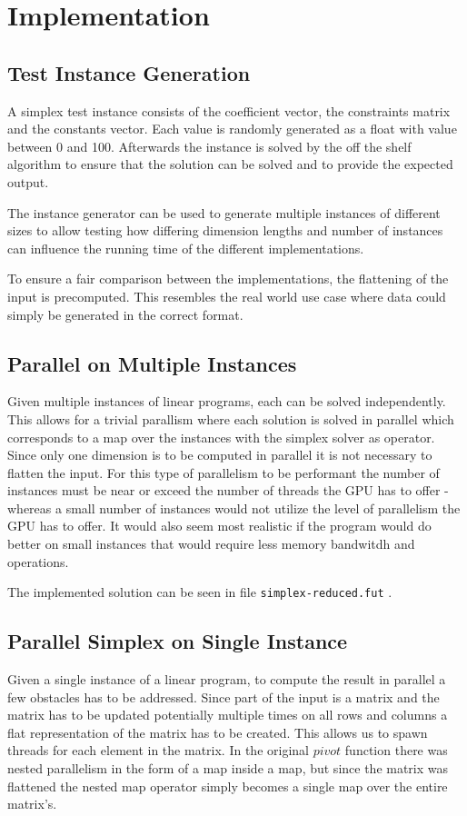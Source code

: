 \section{Implementation}
\subsection{Test Instance Generation}
A simplex test instance consists of the coefficient vector, the constraints matrix and the constants vector. Each value is randomly generated as a float with value between 0 and 100. Afterwards the instance is solved by the off the shelf algorithm to ensure that the solution can be solved and to provide the expected output. 

The instance generator can be used to generate multiple instances of different sizes to allow testing how differing dimension lengths and number of instances can influence the running time of the different implementations.

To ensure a fair comparison between the implementations, the flattening of the input is precomputed. This resembles the real world use case where data could simply be generated in the correct format. 

\subsection{Parallel on Multiple Instances}
Given multiple instances of linear programs, each can be solved independently. This allows for a trivial parallism where each solution is solved in parallel which corresponds to a map over the instances with the simplex solver as operator. Since only one dimension is to be computed in parallel it is not necessary to flatten the input. For this type of parallelism to be performant the number of instances must be near or exceed the number of threads the GPU has to offer - whereas a small number of instances would not utilize the level of parallelism the GPU has to offer. It would also seem most realistic if the program would do better on small instances that would require less memory bandwitdh and operations.

The implemented solution can be seen in file \texttt{simplex-reduced.fut} .

\subsection{Parallel Simplex on Single Instance}
Given a single instance of a linear program, to compute the result in parallel a few obstacles has to be addressed. Since part of the input is a matrix and the matrix has to be updated potentially multiple times on all rows and columns a flat representation of the matrix has to be created. This allows us to spawn threads for each element in the matrix. In the original $pivot$ function there was nested parallelism in the form of a map inside a map, but since the matrix was flattened the nested map operator simply becomes a single map over the entire matrix's. 

